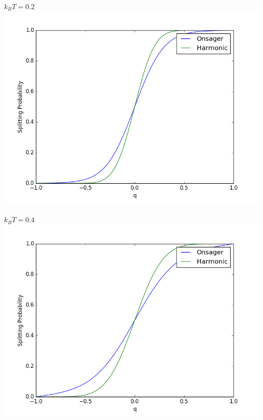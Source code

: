 \documentclass[11pt, oneside]{article}   	%
\begin{document}
\paragraph{}
$k_B T = 0.2$
\includegraphics[scale = 0.5]{kbt2.png}

\paragraph{}
$k_B T = 0.4$
\includegraphics[scale = 0.5]{kbt4.png}
\end{document}
